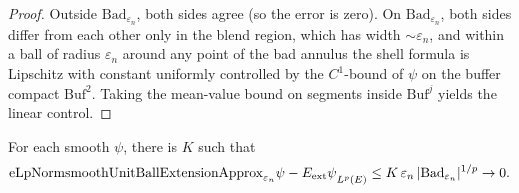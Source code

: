 \begin{proof}
\leanok
{}

Outside $\mathrm{Bad}_{\varepsilon_n}$, both sides agree (so the error is
zero). On $\mathrm{Bad}_{\varepsilon_n}$, both sides differ from each other
only in the blend region, which has width $\sim \varepsilon_n$, and within a
ball of radius $\varepsilon_n$ around any point of the bad annulus the
shell formula is Lipschitz with constant uniformly controlled by the
$C^1$-bound of $\psi$ on the buffer compact $\mathrm{Buf}^2$. Taking the
mean-value bound on segments inside $\mathrm{Buf}^j$ yields the linear
control.
\end{proof}

\begin{theorem}
\label{thm:SmoothApproximationInternal_exists_fun_error_bound_badSet}
\leanok
{}
For each smooth $\psi$, there is $K$ such that
\begin{equation*}
\mathrm{eLpNorm}{\mathrm{smoothUnitBallExtensionApprox}_{\varepsilon_n}\psi - E_{\mathrm{ext}}\psi}_{L^p(E)}
\le K\,\varepsilon_n\,|\mathrm{Bad}_{\varepsilon_n}|^{1/p}
\to 0.
\end{equation*}
\end{theorem}

